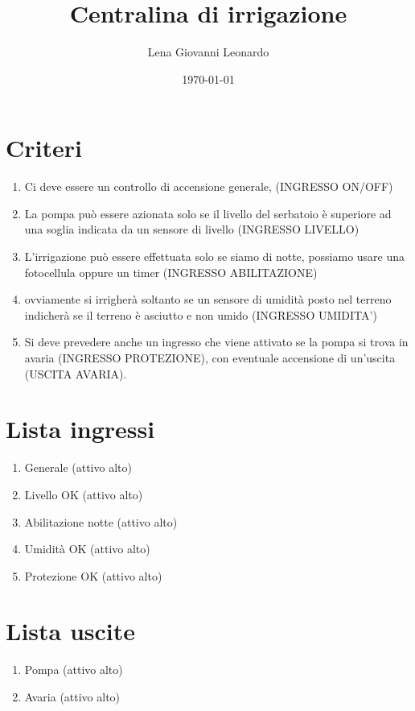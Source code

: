 \documentclass{article}
\title{Centralina di irrigazione}
\author{Lena Giovanni Leonardo}
\date{\today}
\begin{document}
    \maketitle

    \section{Criteri}

    \begin{enumerate}
        \item Ci deve essere un controllo di accensione generale, (INGRESSO ON/OFF)
        \item La pompa può essere azionata solo se il livello del serbatoio è superiore ad una soglia indicata da un sensore di livello (INGRESSO LIVELLO)
        \item L’irrigazione può essere effettuata solo se siamo di notte, possiamo usare una fotocellula oppure un timer (INGRESSO ABILITAZIONE)
        \item ovviamente si irrigherà soltanto se un sensore di umidità posto nel terreno indicherà se il terreno è asciutto e non umido (INGRESSO UMIDITA’)
        \item Si deve prevedere anche un ingresso che viene attivato se la pompa si trova in avaria (INGRESSO PROTEZIONE), con eventuale accensione di un’uscita (USCITA AVARIA).
    \end{enumerate}

    \section{Lista ingressi}

    \begin{enumerate}
        \item Generale (attivo alto)
        \item Livello OK (attivo alto)
        \item Abilitazione notte (attivo alto)
        \item Umidità OK (attivo alto)
        \item Protezione OK (attivo alto)
    \end{enumerate}

    \section{Lista uscite}

    \begin{enumerate}
        \item Pompa (attivo alto)
        \item Avaria (attivo alto)
    \end{enumerate}
\end{document}
